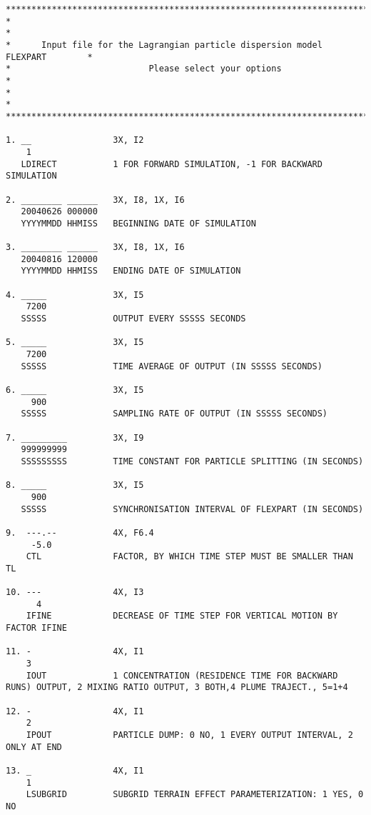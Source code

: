 \documentclass{egu}            %
\begin{document}
\begin{scriptsize}\begin{verbatim}
********************************************************************************
*                                                                              *
*      Input file for the Lagrangian particle dispersion model FLEXPART        *
*                           Please select your options                         *
*                                                                              *
********************************************************************************

1. __                3X, I2
    1       
   LDIRECT           1 FOR FORWARD SIMULATION, -1 FOR BACKWARD SIMULATION

2. ________ ______   3X, I8, 1X, I6
   20040626 000000
   YYYYMMDD HHMISS   BEGINNING DATE OF SIMULATION

3. ________ ______   3X, I8, 1X, I6
   20040816 120000
   YYYYMMDD HHMISS   ENDING DATE OF SIMULATION

4. _____             3X, I5
    7200 
   SSSSS             OUTPUT EVERY SSSSS SECONDS

5. _____             3X, I5
    7200 
   SSSSS             TIME AVERAGE OF OUTPUT (IN SSSSS SECONDS)

6. _____             3X, I5
     900 
   SSSSS             SAMPLING RATE OF OUTPUT (IN SSSSS SECONDS)

7. _________         3X, I9
   999999999
   SSSSSSSSS         TIME CONSTANT FOR PARTICLE SPLITTING (IN SECONDS)

8. _____             3X, I5
     900 
   SSSSS             SYNCHRONISATION INTERVAL OF FLEXPART (IN SECONDS)

9.  ---.--           4X, F6.4
     -5.0
    CTL              FACTOR, BY WHICH TIME STEP MUST BE SMALLER THAN TL

10. ---              4X, I3
      4
    IFINE            DECREASE OF TIME STEP FOR VERTICAL MOTION BY FACTOR IFINE

11. -                4X, I1
    3  
    IOUT             1 CONCENTRATION (RESIDENCE TIME FOR BACKWARD RUNS) OUTPUT, 2 MIXING RATIO OUTPUT, 3 BOTH,4 PLUME TRAJECT., 5=1+4

12. -                4X, I1
    2  
    IPOUT            PARTICLE DUMP: 0 NO, 1 EVERY OUTPUT INTERVAL, 2 ONLY AT END

13. _                4X, I1
    1
    LSUBGRID         SUBGRID TERRAIN EFFECT PARAMETERIZATION: 1 YES, 0 NO


\end{verbatim}
\end{scriptsize}
\end{document}
